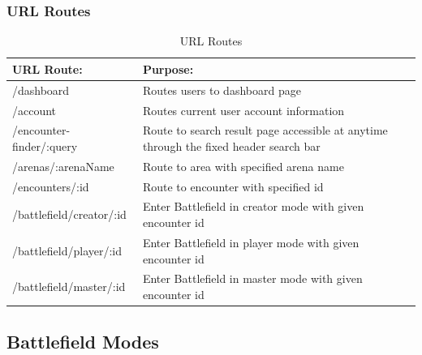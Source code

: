 \documentclass[12pt,a4paper]{report}
\begin{document}
		\subsubsection {URL Routes}
		
			\begin{table}[H]
				\begin{center}
					\begin{tabular}{ |p{5cm}|p{7cm}|| } 
						\hline
						URL Route: & Purpose: \\
						\hline
						/dashboard & Routes users to dashboard page \\
						/account & Routes current user account information\\
						/encounter-finder/:query & Route to search result page accessible at anytime through the fixed header search bar  \\
						/arenas/:arenaName & Route to area with specified arena name  \\
						/encounters/:id & Route to encounter with specified id \\
						/battlefield/creator/:id & Enter Battlefield in creator mode with given encounter id \\
						/battlefield/player/:id & Enter Battlefield in player mode with given encounter id \\
						/battlefield/master/:id & Enter Battlefield in master mode with given encounter id \\	
						\hline
					\end{tabular}
				\end{center}
			\caption{URL Routes} \label{table: URL Routes}
		\end{table}
	
	\subsection{Battlefield Modes}
\end{document}

